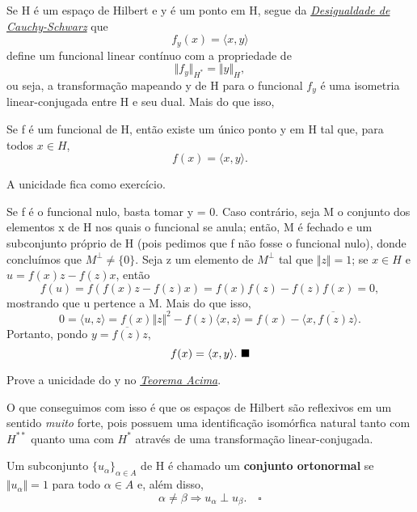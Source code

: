 \documentclass[../functional_analysis.tex]{subfiles}
\begin{document}
Se H é um espaço de Hilbert e y é um ponto em H, segue da \hyperlink{cauchy_schwarz}{\textit{Desigualdade de Cauchy-Schwarz}} que
\[
	f_y(x)=\langle x, y \rangle
\]
define um funcional linear contínuo com a propriedade de
\[
	\Vert f_{y} \Vert_{H^{*}}=\Vert y \Vert_{H},
\]
ou seja, a transformação mapeando y de H para o funcional \(f_y\) é uma isometria linear-conjugada entre H e seu dual. Mais do que isso,
\hypertarget{riesz_representation}{\begin{theorem*}
		Se f é um funcional de H, então existe um único ponto y em H tal que, para todos \(x\in H\),
		\[
			f(x)=\langle x, y \rangle.
		\]
	\end{theorem*}}
\begin{proof*}
	A unicidade fica como exercício.

	Se f é o funcional nulo, basta tomar y = 0. Caso contrário, seja M o conjunto dos elementos x de H nos quais o funcional se anula; então, M é fechado e um subconjunto próprio de H (pois pedimos que f não fosse o funcional nulo), donde concluímos que \(M^{\perp }\neq \{0\}.\) Seja z um elemento de \(M^{\perp }\) tal que \(\Vert z \Vert=1\); se \(x\in H\) e \(u=f(x)z-f(z)x\), então
	\[
		f(u) = f(f(x)z-f(z)x) = f(x)f(z)-f(z)f(x) = 0,
	\]
	mostrando que u pertence a M. Mais do que isso,
	\[
		0=\langle u, z \rangle = f(x)\Vert z \Vert^{2} - f(z)\langle x, z \rangle = f(x)- \langle x, \overline{f(z)}z \rangle.
	\]
	Portanto, pondo \(y=\overline{f(z)}z\),
	\[
		f(x)=\langle x, y \rangle. \text{ $\blacksquare$}
	\]
\end{proof*}
\begin{exr}
	Prove a unicidade do y no \hyperlink{riesz_representation}{\textit{Teorema Acima}}.
\end{exr}
O que conseguimos com isso é que os espaços de Hilbert são reflexivos em um sentido \textit{muito} forte, pois possuem uma identificação isomórfica natural tanto com \(H^{**}\) quanto uma com \(H^{*}\) através de uma transformação linear-conjugada.
\begin{def*}
	Um subconjunto \(\{u_{\alpha }\}_{\alpha \in A}\) de H é chamado um \textbf{conjunto ortonormal} se \(\Vert u_{\alpha } \Vert = 1\) para todo \(\alpha \in A\) e, além disso,
	\[
		\alpha \neq \beta \Rightarrow u_{\alpha }\perp u_{\beta }.\quad \square
	\]
\end{def*}
\end{document}
